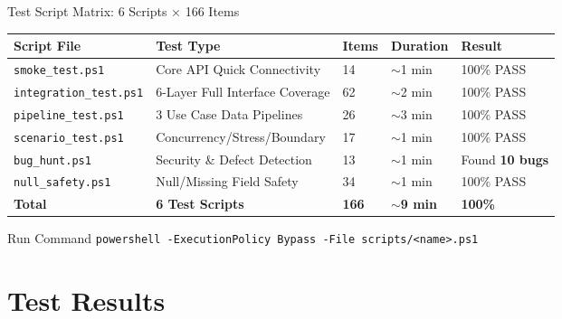 \documentclass[aspectratio=169,utf8,11pt]{beamer}
\newcommand{\bug}[1]{\textcolor{bugred}{\textbf{#1}}}
\begin{document}
\begin{frame}{Test Script Matrix: 6 Scripts × 166 Items}
  \vspace{0.2cm}
  \begin{table}[h]
    \centering
    \renewcommand{\arraystretch}{1.4}
    \footnotesize
    \begin{tabular}{p{3.0cm}p{3.1cm}p{1.3cm}p{1.6cm}p{2.0cm}}
      \toprule
      \textbf{Script File} & \textbf{Test Type} & \textbf{Items} & \textbf{Duration} & \textbf{Result} \\
      \midrule
      \texttt{smoke\_test.ps1} & Core API Quick Connectivity & 14 & $\sim$1 min & \cellcolor{green!15}100\% PASS \\
      \texttt{integration\_test.ps1} & 6-Layer Full Interface Coverage & 62 & $\sim$2 min & \cellcolor{green!15}100\% PASS \\
      \texttt{pipeline\_test.ps1} & 3 Use Case Data Pipelines & 26 & $\sim$3 min & \cellcolor{green!15}100\% PASS \\
      \texttt{scenario\_test.ps1} & Concurrency/Stress/Boundary & 17 & $\sim$1 min & \cellcolor{green!15}100\% PASS \\
      \texttt{bug\_hunt.ps1} & Security \& Defect Detection & 13 & $\sim$1 min & Found \bug{10 bugs} \\
      \texttt{null\_safety.ps1} & Null/Missing Field Safety & 34 & $\sim$1 min & \cellcolor{green!15}100\% PASS \\
      \midrule
      \textbf{Total} & \textbf{6 Test Scripts} & \textbf{166} & \textbf{$\sim$9 min} & \cellcolor{green!15}\textbf{100\%} \\
      \bottomrule
    \end{tabular}
  \end{table}

  \vspace{0.2cm}
  \begin{block}{Run Command}
    \centering
    \texttt{powershell -ExecutionPolicy Bypass -File scripts/<name>.ps1}
  \end{block}
\end{frame}

\section{Test Results}
\end{document}
